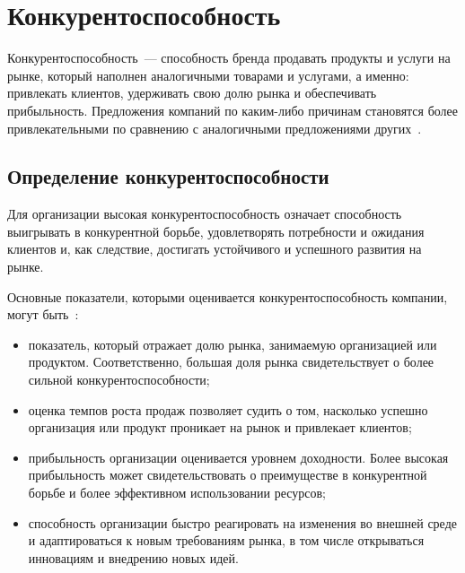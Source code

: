 \chapter{Конкурентоспособность}

Конкурентоспособность~--- способность бренда продавать продукты и услуги на рынке, который наполнен аналогичными товарами и услугами, а именно: привлекать клиентов, удерживать свою долю рынка и обеспечивать прибыльность. 
Предложения компаний по каким-либо причинам становятся более привлекательными по сравнению с аналогичными предложениями других~\cite{enemy}.

\section{Определение конкурентоспособности}
Для организации высокая конкурентоспособность означает способность выигрывать в конкурентной борьбе, удовлетворять потребности и ожидания клиентов и, как следствие, достигать устойчивого и успешного развития на рынке.

Основные показатели, которыми оценивается конкурентоспособность компании, могут быть~\cite{enemy}:
\begin{itemize}
	\item показатель, который отражает долю рынка, занимаемую организацией или продуктом. 
	Соответственно, большая доля рынка свидетельствует о более сильной конкурентоспособности;
	\item оценка темпов роста продаж позволяет судить о том, насколько успешно организация или продукт проникает на рынок и привлекает клиентов;
	\item прибыльность организации оценивается уровнем доходности. 
	Более высокая прибыльность может свидетельствовать о преимуществе в конкурентной борьбе и более эффективном использовании ресурсов;
	\item способность организации быстро реагировать на изменения во внешней среде и адаптироваться к новым требованиям рынка, в том числе открываться инновациям и внедрению новых идей.
\end{itemize}

